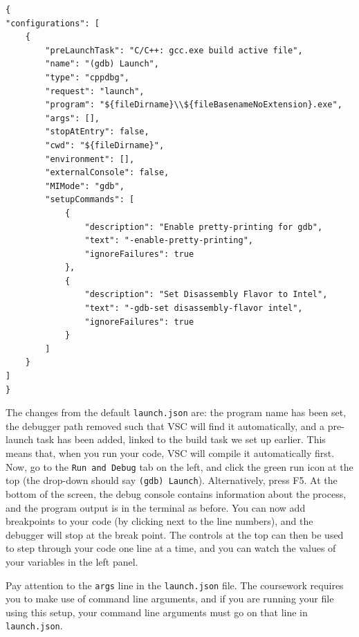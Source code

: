 \documentclass{article}
\begin{document}
\begin{verbatim}
{
"configurations": [
    {   
        "preLaunchTask": "C/C++: gcc.exe build active file",
        "name": "(gdb) Launch",
        "type": "cppdbg",
        "request": "launch",
        "program": "${fileDirname}\\${fileBasenameNoExtension}.exe",
        "args": [],
        "stopAtEntry": false,
        "cwd": "${fileDirname}",
        "environment": [],
        "externalConsole": false,
        "MIMode": "gdb",
        "setupCommands": [
            {
                "description": "Enable pretty-printing for gdb",
                "text": "-enable-pretty-printing",
                "ignoreFailures": true
            },
            {
                "description": "Set Disassembly Flavor to Intel",
                "text": "-gdb-set disassembly-flavor intel",
                "ignoreFailures": true
            }
        ]
    }
]
}
\end{verbatim}
The changes from the default \verb|launch.json| are: the program name has been set, the debugger path removed such that VSC will find it automatically, and a pre-launch task has been added, linked to the build task we set up earlier. This means that, when you run your code, VSC will compile it automatically first. Now, go to the \verb|Run and Debug| tab on the left, and click the green run icon at the top (the drop-down should say \verb|(gdb) Launch|). Alternatively, press F5. At the bottom of the screen, the debug console contains information about the process, and the program output is in the terminal as before. You can now add breakpoints to your code (by clicking next to the line numbers), and the debugger will stop at the break point. The controls at the top can then be used to step through your code one line at a time, and you can watch the values of your variables in the left panel. 

Pay attention to the \verb|args| line in the \verb|launch.json| file. The coursework requires you to make use of command line arguments, and if you are running your file using this setup, your command line arguments must go on that line in \verb|launch.json|.
\end{document}
